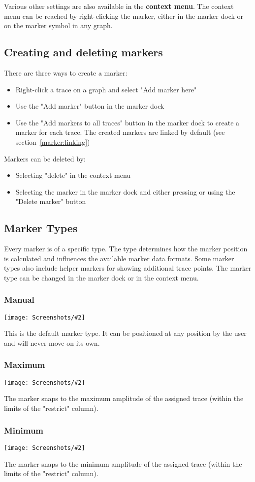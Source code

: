 \documentclass[a4paper,11pt]{article}
\newcommand{\screenshot}[2]{\begin{center}
\texttt{[image: Screenshots/\#2]}
\end{center}}
\begin{document}
Various other settings are also available in the \textbf{context menu}. The context menu can be reached by right-clicking the marker, either in the marker dock or on the marker symbol in any graph.

\subsection{Creating and deleting markers}
There are three ways to create a marker:
\begin{itemize}
\item Right-click a trace on a graph and select "Add marker here"
\item Use the "Add marker" button in the marker dock
\item Use the "Add markers to all traces" button in the marker dock to create a marker for each trace. The created markers are linked by default (see section~\ref{marker:linking})
\end{itemize}
Markers can be deleted by:
\begin{itemize}
\item Selecting "delete" in the context menu
\item Selecting the marker in the marker dock and either pressing  or using the "Delete marker" button
\end{itemize}
\subsection{Marker Types}
\label{marker:types}
Every marker is of a specific type. The type determines how the marker position is calculated and influences the available marker data formats. Some marker types also include helper markers for showing additional trace points. The marker type can be changed in the marker dock or in the context menu.
\subsubsection{Manual}
\screenshot{1.0}{MarkerManual.png}
This is the default marker type. It can be positioned at any position by the user and will never move on its own.
\subsubsection{Maximum}
\screenshot{1.0}{MarkerMaximum.png}
The marker snaps to the maximum amplitude of the assigned trace (within the limits of the "restrict" column).
\subsubsection{Minimum}
\screenshot{1.0}{MarkerMinimum.png}
The marker snaps to the minimum amplitude of the assigned trace (within the limits of the "restrict" column).
\end{document}
